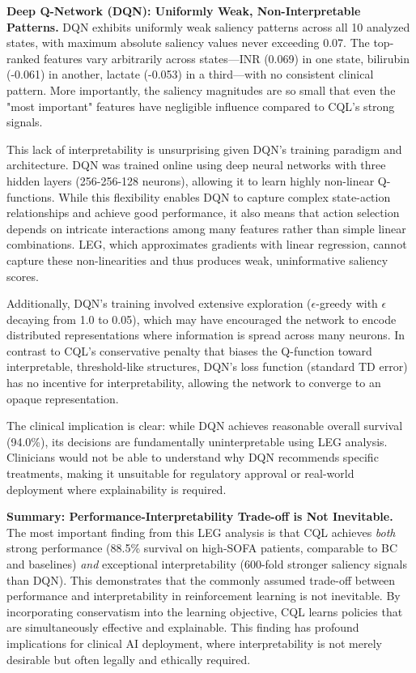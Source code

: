 \textbf{Deep Q-Network (DQN): Uniformly Weak, Non-Interpretable Patterns.} DQN exhibits uniformly weak saliency patterns across all 10 analyzed states, with maximum absolute saliency values never exceeding 0.07. The top-ranked features vary arbitrarily across states—INR (0.069) in one state, bilirubin (-0.061) in another, lactate (-0.053) in a third—with no consistent clinical pattern. More importantly, the saliency magnitudes are so small that even the "most important" features have negligible influence compared to CQL's strong signals.

This lack of interpretability is unsurprising given DQN's training paradigm and architecture. DQN was trained online using deep neural networks with three hidden layers (256-256-128 neurons), allowing it to learn highly non-linear Q-functions. While this flexibility enables DQN to capture complex state-action relationships and achieve good performance, it also means that action selection depends on intricate interactions among many features rather than simple linear combinations. LEG, which approximates gradients with linear regression, cannot capture these non-linearities and thus produces weak, uninformative saliency scores.

Additionally, DQN's training involved extensive exploration ($\epsilon$-greedy with $\epsilon$ decaying from 1.0 to 0.05), which may have encouraged the network to encode distributed representations where information is spread across many neurons. In contrast to CQL's conservative penalty that biases the Q-function toward interpretable, threshold-like structures, DQN's loss function (standard TD error) has no incentive for interpretability, allowing the network to converge to an opaque representation.

The clinical implication is clear: while DQN achieves reasonable overall survival (94.0\%), its decisions are fundamentally uninterpretable using LEG analysis. Clinicians would not be able to understand why DQN recommends specific treatments, making it unsuitable for regulatory approval or real-world deployment where explainability is required.

\textbf{Summary: Performance-Interpretability Trade-off is Not Inevitable.} The most important finding from this LEG analysis is that CQL achieves \textit{both} strong performance (88.5\% survival on high-SOFA patients, comparable to BC and baselines) \textit{and} exceptional interpretability (600-fold stronger saliency signals than DQN). This demonstrates that the commonly assumed trade-off between performance and interpretability in reinforcement learning is not inevitable. By incorporating conservatism into the learning objective, CQL learns policies that are simultaneously effective and explainable. This finding has profound implications for clinical AI deployment, where interpretability is not merely desirable but often legally and ethically required.

